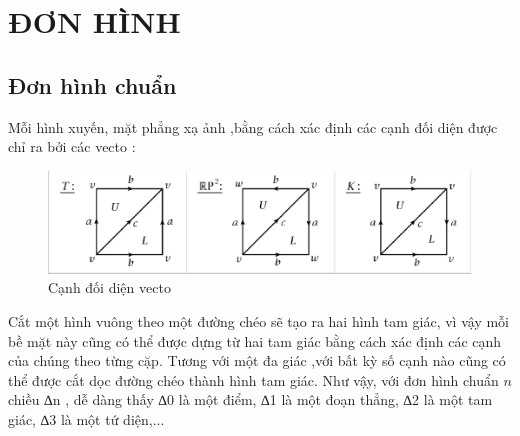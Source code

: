 \chapter{ĐƠN HÌNH}

\section{Đơn hình chuẩn}
\indent Mỗi hình xuyến, mặt phẳng xạ ảnh ,bằng cách xác định các cạnh đối diện được chỉ ra bởi các vecto :
\begin{figure}[h]  
\includegraphics[width=\textwidth]{figures/chap1_1_1}
\caption[Cạnh đối diện vecto]{Cạnh đối diện vecto
\label{fig:chap1_1_1}}
\end{figure}

\indent Cắt một hình vuông theo một đường chéo sẽ tạo ra hai hình tam giác, vì vậy mỗi bề mặt này cũng có thể được dựng từ hai tam giác bằng cách xác định các cạnh của chúng theo từng cặp. Tương với một đa giác ,với bất kỳ số cạnh nào cũng có thể được cắt dọc đường chéo thành  hình tam giác. Như vậy, với đơn hình chuẩn \(n\) chiều  ∆n , dễ dàng thấy  ∆0 là một điểm, ∆1 là một đoạn thẳng, ∆2 là một tam giác, ∆3 là một tứ diện,...

